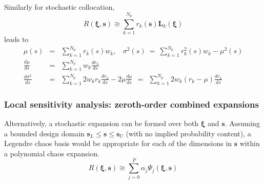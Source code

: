 Similarly for stochastic collocation,
\begin{equation}
R(\boldsymbol{\xi}, \boldsymbol{s}) \cong \sum_{k=1}^{N_p} r_k(\boldsymbol{s}) 
\boldsymbol{L}_k(\boldsymbol{\xi}) \label{eq:R_r_s_L_xi}
\end{equation}
leads to
\begin{eqnarray}
\mu(s) &=& \sum_{k=1}^{N_p} r_k(s) w_k, ~~~~\sigma^2(s) ~=~ \sum_{k=1}^{N_p} r^2_k(s) w_k - \mu^2(s) \label{eq:var_sc} \\
\frac{d\mu}{ds} &=& %
\sum_{k=1}^{N_p} w_k \frac{dr_k}{ds} \label{eq:dmuR_ds_xi_sc} \\
\frac{d\sigma^2}{ds} &=& \sum_{k=1}^{N_p} 2 w_k r_k \frac{dr_k}{ds}
- 2 \mu \frac{d\mu}{ds} 
~~=~~ \sum_{k=1}^{N_p} 2 w_k (r_k - \mu) \frac{dr_k}{ds}
\label{eq:dsigR_ds_xi_sc}
\end{eqnarray}

\subsubsection{Local sensitivity analysis: zeroth-order combined expansions} \label{ouu:sebdo:ssa:dvsa_cve}

Alternatively, a stochastic expansion can be formed over both
$\boldsymbol{\xi}$ and $\boldsymbol{s}$.  Assuming a bounded
design domain $\boldsymbol{s}_L \le \boldsymbol{s} \le
\boldsymbol{s}_U$ (with no implied probability content), a Legendre 
chaos basis would be appropriate for each of the dimensions in 
$\boldsymbol{s}$ within a polynomial chaos expansion.
\begin{equation}
R(\boldsymbol{\xi}, \boldsymbol{s}) \cong \sum_{j=0}^P \alpha_j 
\Psi_j(\boldsymbol{\xi}, \boldsymbol{s}) \label{eq:R_alpha_psi_xi_s}
\end{equation}

